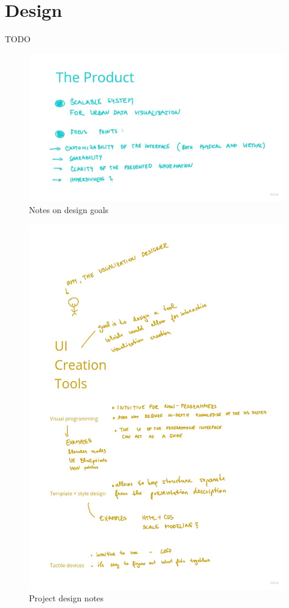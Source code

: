 \section{Design}
TODO

\begin{figure}[h]
    \centering
    \includegraphics[width=\linewidth]{img/product.jpg}
    \caption{Notes on design goals}
\end{figure}

\begin{figure}[h]
    \centering
    \includegraphics[width=\linewidth]{img/tools.jpg}
    \caption{Project design notes}
\end{figure}

